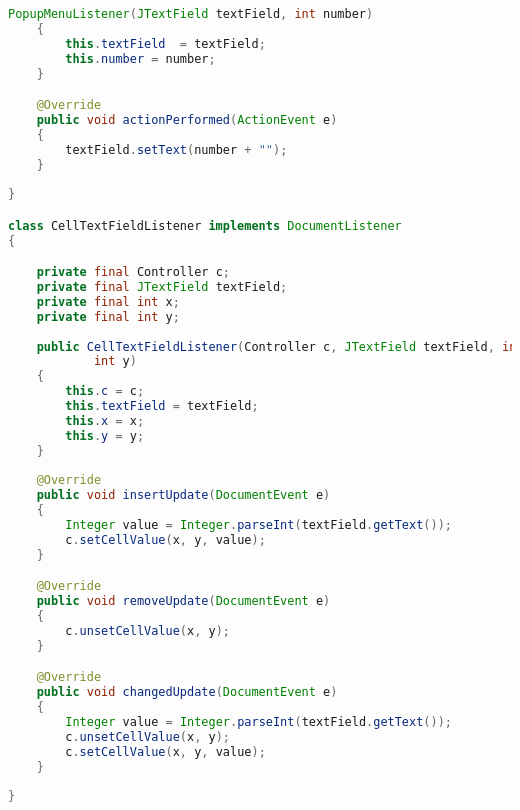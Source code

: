 \begin{lstlisting}[language=Java,basicstyle=\tiny,caption=GUI.java]
    PopupMenuListener(JTextField textField, int number)
    {
        this.textField  = textField;
        this.number = number; 
    }

    @Override
    public void actionPerformed(ActionEvent e)
    {
        textField.setText(number + "");
    }
    
}

class CellTextFieldListener implements DocumentListener
{

    private final Controller c;
    private final JTextField textField;
    private final int x;
    private final int y;
    
    public CellTextFieldListener(Controller c, JTextField textField, int x, 
            int y)
    {
        this.c = c;
        this.textField = textField;
        this.x = x;
        this.y = y;
    }
    
    @Override
    public void insertUpdate(DocumentEvent e)
    {
        Integer value = Integer.parseInt(textField.getText());
        c.setCellValue(x, y, value);
    }

    @Override
    public void removeUpdate(DocumentEvent e)
    {
        c.unsetCellValue(x, y);
    }

    @Override
    public void changedUpdate(DocumentEvent e)
    {
        Integer value = Integer.parseInt(textField.getText());
        c.unsetCellValue(x, y);
        c.setCellValue(x, y, value);
    }
    
}
\end{lstlisting}

